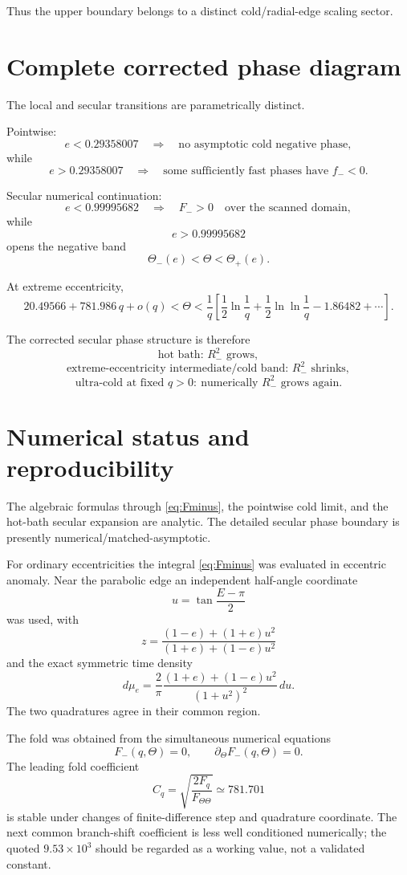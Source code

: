 \documentclass[11pt]{article}
\theoremstyle{remark}
\newcommand{\1}{\mathbf 1}
\begin{document}
Thus the upper boundary belongs to a distinct cold/radial-edge scaling sector.

\section{Complete corrected phase diagram}

The local and secular transitions are parametrically distinct.

Pointwise:
\[
e<0.29358007
\quad\Rightarrow\quad
\text{no asymptotic cold negative phase},
\]
while
\[
e>0.29358007
\quad\Rightarrow\quad
\text{some sufficiently fast phases have }f_-<0.
\]

Secular numerical continuation:
\[
e<0.99995682
\quad\Rightarrow\quad
F_->0
\quad\text{over the scanned domain},
\]
while
\[
e>0.99995682
\]
opens the negative band
\[
\Theta_-(e)<\Theta<\Theta_+(e).
\]

At extreme eccentricity,
\begin{equation}
\boxed{
20.49566+781.986\,q+o(q)
<
\Theta
<
\frac1q
\left[
\frac12\ln\frac1q
+
\frac12\ln\ln\frac1q
-
1.86482+\cdots
\right].
}
\end{equation}

The corrected secular phase structure is therefore
\[
\boxed{
\text{hot bath: }R_-^2\text{ grows},
}
\]
\[
\boxed{
\text{extreme-eccentricity intermediate/cold band: }R_-^2\text{ shrinks},
}
\]
\[
\boxed{
\text{ultra-cold at fixed }q>0:\ \text{numerically }R_-^2\text{ grows again}.
}
\]

\section{Numerical status and reproducibility}

The algebraic formulas through \eqref{eq:Fminus}, the pointwise cold limit,
and the hot-bath secular expansion are analytic.  The detailed secular phase
boundary is presently numerical/matched-asymptotic.

For ordinary eccentricities the integral \eqref{eq:Fminus} was evaluated in
eccentric anomaly.  Near the parabolic edge an independent half-angle
coordinate
\[
u=\tan\frac{E-\pi}{2}
\]
was used, with
\[
z=
\frac{(1-e)+(1+e)u^2}
{(1+e)+(1-e)u^2}
\]
and the exact symmetric time density
\[
d\mu_e
=
\frac{2}{\pi}
\frac{(1+e)+(1-e)u^2}{(1+u^2)^2}\,du.
\]
The two quadratures agree in their common region.

The fold was obtained from the simultaneous numerical equations
\[
F_-(q,\Theta)=0,
\qquad
\partial_\Theta F_-(q,\Theta)=0.
\]
The leading fold coefficient
\[
C_q=\sqrt{\frac{2F_q}{F_{\Theta\Theta}}}
\simeq781.701
\]
is stable under changes of finite-difference step and quadrature coordinate.
The next common branch-shift coefficient is less well conditioned numerically;
the quoted \(9.53\times10^3\) should be regarded as a working value, not a
validated constant.
\end{document}
